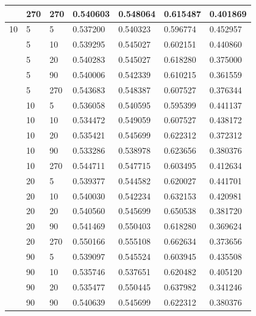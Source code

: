\documentclass[pageno]{jpaper}
\begin{document}
\begin{longtable}{p{2cm} p{2cm} p{2cm} p{2cm} p{2cm} p{2cm} p{2cm}}
& 270 & 270 & 0.540603 & 0.548064 & 0.615487 & 0.401869 \\
\hline
10 & 5 & 5 & 0.537200 & 0.540323 & 0.596774 & 0.452957 \\

& 5 & 10 & 0.539295 & 0.545027 & 0.602151 & 0.440860 \\

& 5 & 20 & 0.540283 & 0.545027 & 0.618280 & 0.375000 \\

& 5 & 90 & 0.540006 & 0.542339 & 0.610215 & 0.361559 \\

& 5 & 270 & 0.543683 & 0.548387 & 0.607527 & 0.376344 \\

& 10 & 5 & 0.536058 & 0.540595 & 0.595399 & 0.441137 \\

& 10 & 10 & 0.534472 & 0.549059 & 0.607527 & 0.438172 \\

& 10 & 20 & 0.535421 & 0.545699 & 0.622312 & 0.372312 \\

& 10 & 90 & 0.533286 & 0.538978 & 0.623656 & 0.380376 \\

& 10 & 270 & 0.544711 & 0.547715 & 0.603495 & 0.412634 \\

& 20 & 5 & 0.539377 & 0.544582 & 0.620027 & 0.441701 \\

& 20 & 10 & 0.540030 & 0.542234 & 0.632153 & 0.420981 \\

& 20 & 20 & 0.540560 & 0.545699 & 0.650538 & 0.381720 \\

& 20 & 90 & 0.541469 & 0.550403 & 0.618280 & 0.369624 \\

& 20 & 270 & 0.550166 & 0.555108 & 0.662634 & 0.373656 \\

& 90 & 5 & 0.539097 & 0.545524 & 0.603945 & 0.435508 \\

& 90 & 10 & 0.535746 & 0.537651 & 0.620482 & 0.405120 \\

& 90 & 20 & 0.535477 & 0.550445 & 0.637982 & 0.341246 \\

& 90 & 90 & 0.540639 & 0.545699 & 0.622312 & 0.380376 \\


\end{longtable}
\end{document}
